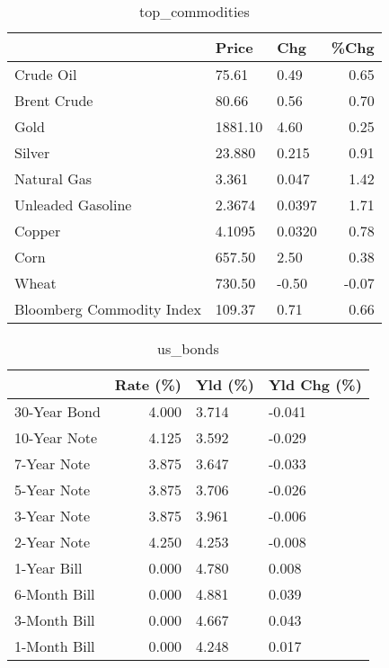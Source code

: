 \documentclass{article}%
\begin{document}
\begin{table}[htbp]%
\caption{top\_commodities}%
\centering%
\begin{adjustbox}{width=1\textwidth}%
\begin{tabular}{lllr}
\toprule
                          &   Price &    Chg &  \%Chg \\
\midrule
               Crude Oil  &   75.61 &   0.49 &  0.65 \\
             Brent Crude  &   80.66 &   0.56 &  0.70 \\
                    Gold  & 1881.10 &   4.60 &  0.25 \\
                  Silver  &  23.880 &  0.215 &  0.91 \\
             Natural Gas  &   3.361 &  0.047 &  1.42 \\
       Unleaded Gasoline  &  2.3674 & 0.0397 &  1.71 \\
                  Copper  &  4.1095 & 0.0320 &  0.78 \\
                    Corn  &  657.50 &   2.50 &  0.38 \\
                   Wheat  &  730.50 &  -0.50 & -0.07 \\
Bloomberg Commodity Index &  109.37 &   0.71 &  0.66 \\
\bottomrule
\end{tabular}
%
\end{adjustbox}%
\end{table}

%


\begin{table}[htbp]%
\caption{us\_bonds}%
\centering%
\begin{adjustbox}{width=1\textwidth}%
\begin{tabular}{lrll}
\toprule
             &  Rate (\%) & Yld (\%) & Yld Chg (\%) \\
\midrule
30-Year Bond &     4.000 &   3.714 &      -0.041 \\
10-Year Note &     4.125 &   3.592 &      -0.029 \\
 7-Year Note &     3.875 &   3.647 &      -0.033 \\
 5-Year Note &     3.875 &   3.706 &      -0.026 \\
 3-Year Note &     3.875 &   3.961 &      -0.006 \\
 2-Year Note &     4.250 &   4.253 &      -0.008 \\
 1-Year Bill &     0.000 &   4.780 &       0.008 \\
6-Month Bill &     0.000 &   4.881 &       0.039 \\
3-Month Bill &     0.000 &   4.667 &       0.043 \\
1-Month Bill &     0.000 &   4.248 &       0.017 \\
\bottomrule
\end{tabular}
%
\end{adjustbox}%
\end{table}
\end{document}
